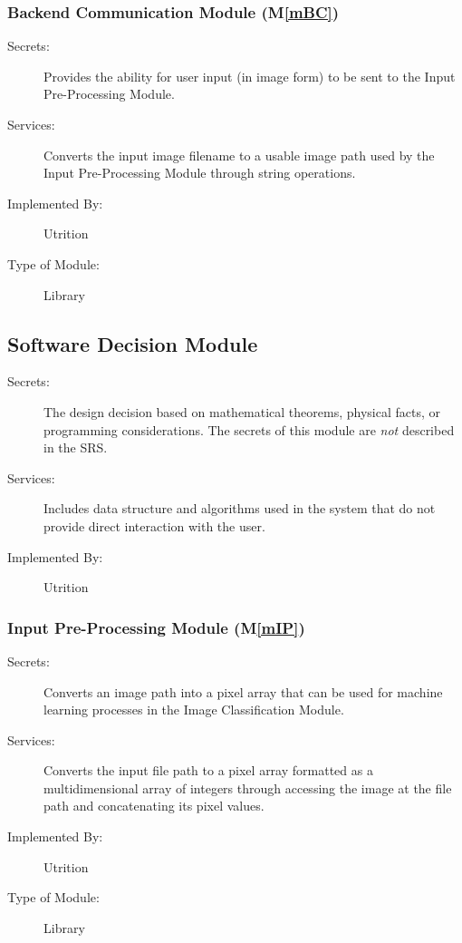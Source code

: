 \documentclass[12pt, titlepage]{article}
\newcommand{\mref}[1]{M\ref{#1}}
\begin{document}
\subsubsection{Backend Communication Module (\mref{mBC})}

\begin{description}
	\item[Secrets:] Provides the ability for user input (in image form) to be sent to the Input 
	Pre-Processing Module.
	\item[Services:]Converts the input image filename to a usable image path 
	used by the Input Pre-Processing Module through string operations.
	\item[Implemented By:] Utrition
 	\item[Type of Module:] Library
\end{description}

\subsection{Software Decision Module}

\begin{description}
\item[Secrets:] The design decision based on mathematical theorems, physical
  facts, or programming considerations. The secrets of this module are
  \emph{not} described in the SRS.
\item[Services:] Includes data structure and algorithms used in the system that
  do not provide direct interaction with the user. 
\item[Implemented By:] Utrition
\end{description}

\subsubsection{Input Pre-Processing Module (\mref{mIP})}

\begin{description}
	\item[Secrets:] Converts an image path into a pixel array that can be used for machine learning processes in the Image Classification Module.
	\item[Services:] Converts the input file path to a pixel array formatted as a multidimensional array of integers through accessing the image at the file path and concatenating its pixel values.
	\item[Implemented By:] Utrition
	\item[Type of Module:] Library
\end{description}
\end{document}
